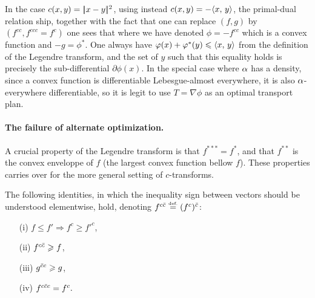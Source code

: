 \begin{rem}\label{rem-proof-brenier}
	In the case $c(x,y)=|\!| x-y |\!|^2$, using instead $c(x,y)=-\langle x,\,y\rangle$, the primal-dual relation ship, together with the fact that one can replace $(f,g)$ by $(f^{cc},f^{ccc}=f^c)$ one sees that 
	where we have denoted $\phi=-f^{cc}$ which is a convex function and $-g=\phi^*$. 
	One always have $\varphi(x)+\varphi^*(y) \leqslant \langle x,\,y\rangle$ from the definition of the Legendre transform, and the set of $y$ such that this equality holds is precisely the sub-differential $\partial\phi(x)$.
	In the special case where $\alpha$ has a density, since a convex function is differentiable Lebesgue-almost everywhere, it is also $\alpha$-everywhere differentiable, so it is legit to use $T=\nabla\phi$ as an optimal transport plan.
\end{rem}



\paragraph{The failure of alternate optimization.}

A crucial property of the Legendre transform is that $f^{***}=f^*$, and that $f^{**}$ is the convex enveloppe of $f$ (the largest convex function bellow $f$). These properties carries over for the more general setting of $c$-transforms.

\begin{prop}
The following identities, in which the inequality sign between vectors should be understood elementwise, hold, denoting $f^{c\bar c} \stackrel{\mbox{\upshape\tiny def.}}{=} (f^{c})^{\bar c}$:
	\begin{itemize}
	\item[(i)] $f \leq f' \Rightarrow f^{c}\geq f'^{c}$, 
	\item[(ii)] $f^{c\bar{c}} \geqslant f$, 
	\item [(iii)] $g^{\bar{c}c} \geqslant g$, 
	\item[(iv)] $f^{c\bar{c}c}=f^{c}.$
	\end{itemize}	
\end{prop}

